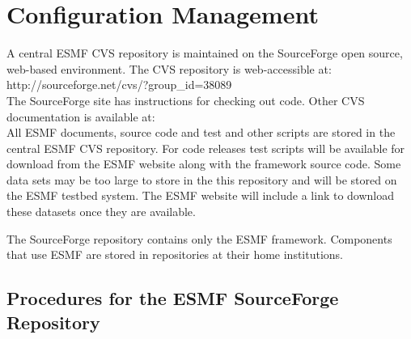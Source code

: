 
\section{Configuration Management}
\label{sec:cm}

A central ESMF CVS repository is maintained on the 
SourceForge open source, web-based environment.  The CVS repository is 
web-accessible at: \newline
{}
{http://sourceforge.net/cvs/?group_id=38089} \\

The SourceForge site has instructions for checking out code.  Other CVS
documentation is available at: \newline
{} \\

All ESMF documents, source code and test and other scripts are stored
in the central ESMF CVS repository.  For code releases 
test scripts will be available for download from the ESMF website along 
with the framework source code.  Some data sets may be too large to store 
in the this 
repository and will be stored on the ESMF testbed system.  The ESMF
website will include a link to download these datasets once they are
available.

The SourceForge repository contains only the ESMF framework.  Components
that use ESMF are stored in repositories at their home institutions.\\

\subsection{Procedures for the ESMF SourceForge Repository}

